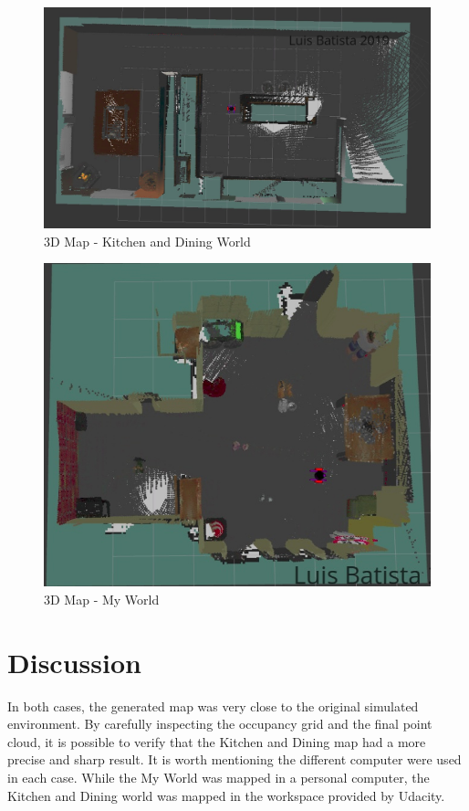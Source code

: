 \documentclass[10pt,journal,compsoc]{IEEEtran}
\begin{document}
\begin{figure}[H]
\centering
  \includegraphics[width=.9\linewidth]{kd_world_3d.png}
  \caption{3D Map - Kitchen and Dining World}
  \label{fig:kd-3d}
\end{figure}%

\begin{figure}[H]
\centering
  \includegraphics[width=.7\linewidth]{my_world_3d.png}
  \caption{3D Map - My World}
  \label{fig:my-3d}
\end{figure}



\section{Discussion}

In both cases, the generated map was very close to the original simulated environment. By carefully inspecting the occupancy grid and the final point cloud, it is possible to verify that the Kitchen and Dining map had a more precise and sharp result. It is worth mentioning the different computer were used in each case. While the My World was mapped in a personal computer, the Kitchen and Dining world was mapped in the workspace provided by Udacity.
\end{document}
